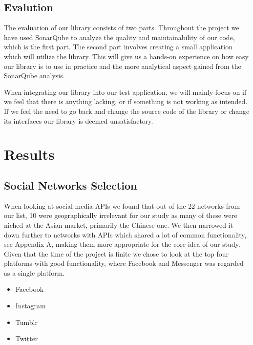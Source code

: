 \documentclass{sigchi-alternate}
\begin{document}
\subsection{Evalution}
The evaluation of our library consists of two parts. Throughout the project we have used SonarQube to analyze the quality and maintainability of our code, which is the first part. The second part
involves creating a small application which will utilize the library. This will give us a hands-on experience on how easy our library is to use in practice and the more analytical aspect gained
from the SonarQube analysis. 

When integrating our library into our test application, we will mainly focus on if we feel that there is anything lacking, or if something is not working as intended. If we feel the need to go back and
change the source code of the library or change its interfaces our library is deemed unsatisfactory. 

\section{Results}
\subsection{Social Networks Selection}
When looking at social media APIs we found that out of the 22 networks from our list\autocite{STATISTA_LEADING_SOCIAL_NETWORKS}, 10 were geographically irrelevant for our study as many of these were
niched at the Asian market, primarily the Chinese one. We then narrowed it down further to networks with APIs which shared a lot of common functionality, see Appendix A, making them more appropriate for the core idea
of our study. Given that the time of the project is finite we chose to look at the top four platforms with good functionality, where Facebook and Messenger was regarded as a single platform.
\begin{itemize}
	\item Facebook
	\item Instagram
	\item Tumblr
	\item Twitter
\end{itemize}
\end{document}
